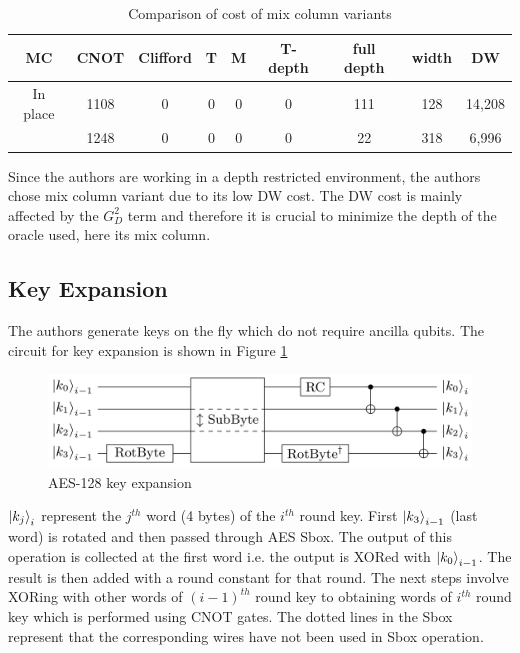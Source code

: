 \documentclass[preprint]{transcrypto}
\begin{document}
\begin{center}
\begin{table}[h!]
    \centering
    \begin{tabular}{ |c|c|c|c|c|c|c|c|c| } 
     \hline
     MC & CNOT & Clifford & T & M & T-depth & full depth & width & DW \\ \hline
    In place  & 1108&0&0&0&0&111&128 &14,208  \\ \hline
     \cite{aesmc} & 1248&0&0&0&0&22&318&6,996  \\ \hline
    \end{tabular}
    \caption{Comparison of cost of mix column variants}
    \label{tab:aesmc}
\end{table}
\end{center}

Since the authors are working in a depth restricted environment, the authors chose \cite{aesmc} mix column variant due to its low DW cost. The DW cost is mainly affected by the $G_D^2$ term and therefore it is crucial to minimize the depth of the oracle used, here its mix column.

\subsection{Key Expansion}
The authors generate keys on the fly which do not require ancilla qubits. The circuit for key expansion is shown in Figure \ref{fig:aeske}

\begin{figure}[h!]
    \centering
    \includegraphics[width=\linewidth]{aes/aeske.png}
    \caption{AES-128 key expansion \cite{aeslowmc}}
    \label{fig:aeske}
\end{figure}

$\ket{k_j}_i$ represent the $j^{th}$ word (4 bytes) of the $i^{th}$ round key. First $\ket{k_3}_{i-1}$ (last word) is rotated and then passed through AES Sbox. The output of this operation is collected at the first word i.e. the output is XORed with $\ket{k_0}_{i-1}$. The result is then added with a round constant for that round. The next steps involve XORing with other words of $(i-1)^{th}$ round key to obtaining words of $i^{th}$ round key which is performed using CNOT gates. The dotted lines in the Sbox represent that the corresponding wires have not been used in Sbox operation.
\end{document}
